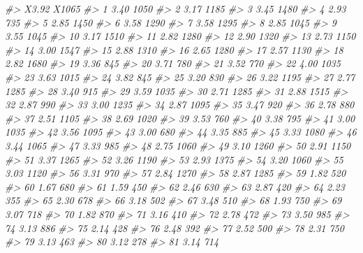 \documentclass[]{book}
\newenvironment{Shaded}{\begin{snugshade}}{\end{snugshade}}
\newcommand{\CommentTok}[1]{\textcolor[rgb]{0.56,0.35,0.01}{\textit{#1}}}
\begin{document}
\begin{Shaded}
\begin{Highlighting}[]
\CommentTok{#>     X3.92 X1065}
\CommentTok{#> 1    3.40  1050}
\CommentTok{#> 2    3.17  1185}
\CommentTok{#> 3    3.45  1480}
\CommentTok{#> 4    2.93   735}
\CommentTok{#> 5    2.85  1450}
\CommentTok{#> 6    3.58  1290}
\CommentTok{#> 7    3.58  1295}
\CommentTok{#> 8    2.85  1045}
\CommentTok{#> 9    3.55  1045}
\CommentTok{#> 10   3.17  1510}
\CommentTok{#> 11   2.82  1280}
\CommentTok{#> 12   2.90  1320}
\CommentTok{#> 13   2.73  1150}
\CommentTok{#> 14   3.00  1547}
\CommentTok{#> 15   2.88  1310}
\CommentTok{#> 16   2.65  1280}
\CommentTok{#> 17   2.57  1130}
\CommentTok{#> 18   2.82  1680}
\CommentTok{#> 19   3.36   845}
\CommentTok{#> 20   3.71   780}
\CommentTok{#> 21   3.52   770}
\CommentTok{#> 22   4.00  1035}
\CommentTok{#> 23   3.63  1015}
\CommentTok{#> 24   3.82   845}
\CommentTok{#> 25   3.20   830}
\CommentTok{#> 26   3.22  1195}
\CommentTok{#> 27   2.77  1285}
\CommentTok{#> 28   3.40   915}
\CommentTok{#> 29   3.59  1035}
\CommentTok{#> 30   2.71  1285}
\CommentTok{#> 31   2.88  1515}
\CommentTok{#> 32   2.87   990}
\CommentTok{#> 33   3.00  1235}
\CommentTok{#> 34   2.87  1095}
\CommentTok{#> 35   3.47   920}
\CommentTok{#> 36   2.78   880}
\CommentTok{#> 37   2.51  1105}
\CommentTok{#> 38   2.69  1020}
\CommentTok{#> 39   3.53   760}
\CommentTok{#> 40   3.38   795}
\CommentTok{#> 41   3.00  1035}
\CommentTok{#> 42   3.56  1095}
\CommentTok{#> 43   3.00   680}
\CommentTok{#> 44   3.35   885}
\CommentTok{#> 45   3.33  1080}
\CommentTok{#> 46   3.44  1065}
\CommentTok{#> 47   3.33   985}
\CommentTok{#> 48   2.75  1060}
\CommentTok{#> 49   3.10  1260}
\CommentTok{#> 50   2.91  1150}
\CommentTok{#> 51   3.37  1265}
\CommentTok{#> 52   3.26  1190}
\CommentTok{#> 53   2.93  1375}
\CommentTok{#> 54   3.20  1060}
\CommentTok{#> 55   3.03  1120}
\CommentTok{#> 56   3.31   970}
\CommentTok{#> 57   2.84  1270}
\CommentTok{#> 58   2.87  1285}
\CommentTok{#> 59   1.82   520}
\CommentTok{#> 60   1.67   680}
\CommentTok{#> 61   1.59   450}
\CommentTok{#> 62   2.46   630}
\CommentTok{#> 63   2.87   420}
\CommentTok{#> 64   2.23   355}
\CommentTok{#> 65   2.30   678}
\CommentTok{#> 66   3.18   502}
\CommentTok{#> 67   3.48   510}
\CommentTok{#> 68   1.93   750}
\CommentTok{#> 69   3.07   718}
\CommentTok{#> 70   1.82   870}
\CommentTok{#> 71   3.16   410}
\CommentTok{#> 72   2.78   472}
\CommentTok{#> 73   3.50   985}
\CommentTok{#> 74   3.13   886}
\CommentTok{#> 75   2.14   428}
\CommentTok{#> 76   2.48   392}
\CommentTok{#> 77   2.52   500}
\CommentTok{#> 78   2.31   750}
\CommentTok{#> 79   3.13   463}
\CommentTok{#> 80   3.12   278}
\CommentTok{#> 81   3.14   714}

\end{Highlighting}
\end{Shaded}
\end{document}
